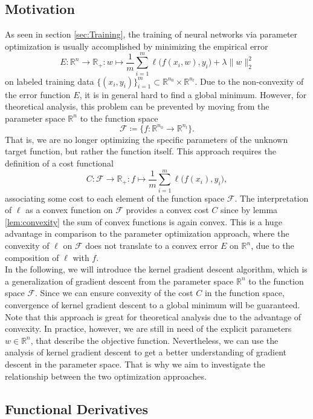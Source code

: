 \documentclass[11pt, a4paper]{article}
\newcommand{\R}{\mathbb{R}}
\newcommand{\F}{\mathcal{F}}
\begin{document}
\subsection{Motivation}

As seen in section \ref{sec:Training}, the training of neural networks via parameter optimization is usually accomplished by minimizing the empirical error
\[ E : \R^n \to \R_+ : w \mapsto \frac{1}{m} \sum_{i=1}^{m} \ell \big ( f(x_i,w),y_i \big) + \lambda \big \| w \big \|_2^2 \]
on labeled training data $\{ (x_i,y_i) \}_{i=1}^m \subset \R^{n_0} \times \R^{n_l}$. Due to the non-convexity of the error function $E$, it is in general hard to find a global minimum. However, for theoretical analysis, this problem can be prevented by moving from the parameter space $\R^n$ to the function space
\[ \F \coloneq \Big \{ f: \R^{n_0} \to \R^{n_l} \Big \}. \]
That is, we are no longer optimizing the specific parameters of the unknown target function, but rather the function itself. This approach requires the definition of a cost functional
\[ C: \F \to \R_+ : f \mapsto \frac{1}{m} \sum_{i=1}^{m} \ell \big ( f(x_i),y_i \big), \]
associating some cost to each element of the function space $\F$. The interpretation of $\ell$ as a convex function on $\F$ provides a convex cost $C$ since by lemma \ref{lem:convexity} the sum of convex functions is again convex. This is a huge advantage in comparison to the parameter optimization approach, where the  convexity of $\ell$ on $\F$ does not translate to a convex error $E$ on $\R^n$, due to the composition of $\ell$ with $f$. \\

In the following, we will introduce the kernel gradient descent algorithm, which is a generalization of gradient descent from the parameter space $\R^n$ to the function space $\F$. Since we can ensure convexity of the cost $C$ in the function space, convergence of kernel gradient descent to a global minimum will be guaranteed. \\

Note that this approach is great for theoretical analysis due to the advantage of convexity. In practice, however, we are still in need of the explicit parameters $w \in \R^n$, that describe the objective function. Nevertheless, we can use the analysis of kernel gradient descent to get a better understanding of gradient descent in the parameter space. That is why we aim to investigate the relationship between the two optimization approaches.


\subsection{Functional Derivatives}
\end{document}
